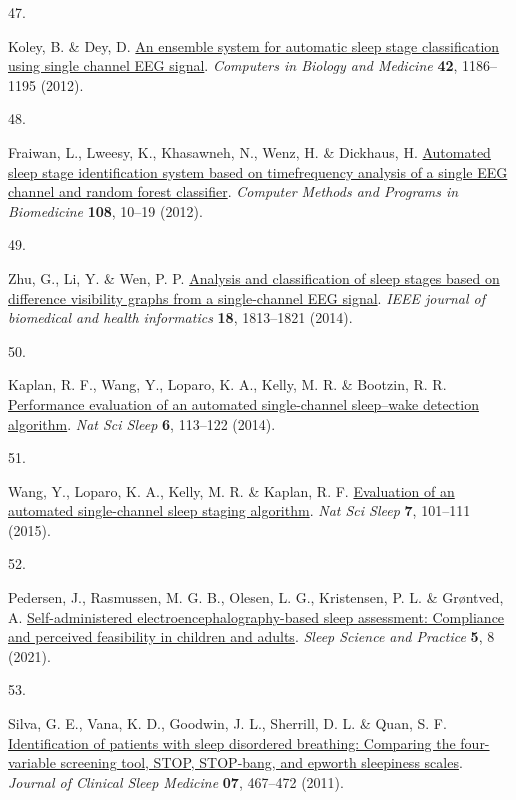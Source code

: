 \documentclass[
  10pt,
]{scrbook}
\newlength{\cslhangindent}
\newlength{\csllabelwidth}
\newlength{\cslentryspacingunit} %
\newenvironment{CSLReferences}[2] %
 {%
  \setlength{\parindent}{0pt}
  \ifodd #1
  \let\oldpar\par
  \def\par{\hangindent=\cslhangindent\oldpar}
  \fi
  \setlength{\parskip}{#2\cslentryspacingunit}
 }%
 {}
\newcommand{\CSLLeftMargin}[1]{\parbox[t]{\csllabelwidth}{#1}}
\newcommand{\CSLRightInline}[1]{\parbox[t]{\linewidth - \csllabelwidth}{#1}\break}
\let\originaltextbf\textbf
\renewcommand{\textbf}[1]{\textcolor{color1}{\textsf{\originaltextbf{#1}}}}
\begin{document}
\begin{CSLReferences}{0}{0}
\leavevmode{}%
\CSLLeftMargin{47. }%
\CSLRightInline{Koley, B. \& Dey, D.
\href{https://doi.org/10.1016/j.compbiomed.2012.09.012}{An ensemble
system for automatic sleep stage classification using single channel EEG
signal}. \emph{Computers in Biology and Medicine} \textbf{42},
1186--1195 (2012).}

\leavevmode{}%
\CSLLeftMargin{48. }%
\CSLRightInline{Fraiwan, L., Lweesy, K., Khasawneh, N., Wenz, H. \&
Dickhaus, H. \href{https://doi.org/10.1016/j.cmpb.2011.11.005}{Automated
sleep stage identification system based on time{\textendash}frequency
analysis of a single EEG channel and random forest classifier}.
\emph{Computer Methods and Programs in Biomedicine} \textbf{108}, 10--19
(2012).}

\leavevmode{}%
\CSLLeftMargin{49. }%
\CSLRightInline{Zhu, G., Li, Y. \& Wen, P. P.
\href{https://doi.org/10.1109/JBHI.2014.2303991}{Analysis and
classification of sleep stages based on difference visibility graphs
from a single-channel EEG signal}. \emph{IEEE journal of biomedical and
health informatics} \textbf{18}, 1813--1821 (2014).}

\leavevmode{}%
\CSLLeftMargin{50. }%
\CSLRightInline{Kaplan, R. F., Wang, Y., Loparo, K. A., Kelly, M. R. \&
Bootzin, R. R. \href{https://doi.org/10.2147/NSS.S71159}{Performance
evaluation of an automated single-channel sleep--wake detection
algorithm}. \emph{Nat Sci Sleep} \textbf{6}, 113--122 (2014).}

\leavevmode{}%
\CSLLeftMargin{51. }%
\CSLRightInline{Wang, Y., Loparo, K. A., Kelly, M. R. \& Kaplan, R. F.
\href{https://doi.org/10.2147/NSS.S77888}{Evaluation of an automated
single-channel sleep staging algorithm}. \emph{Nat Sci Sleep}
\textbf{7}, 101--111 (2015).}

\leavevmode{}%
\CSLLeftMargin{52. }%
\CSLRightInline{Pedersen, J., Rasmussen, M. G. B., Olesen, L. G.,
Kristensen, P. L. \& Grøntved, A.
\href{https://doi.org/10.1186/s41606-021-00059-1}{Self-administered
electroencephalography-based sleep assessment: Compliance and perceived
feasibility in children and adults}. \emph{Sleep Science and Practice}
\textbf{5}, 8 (2021).}

\leavevmode{}%
\CSLLeftMargin{53. }%
\CSLRightInline{Silva, G. E., Vana, K. D., Goodwin, J. L., Sherrill, D.
L. \& Quan, S. F.
\href{https://doi.org/10.5664/JCSM.1308}{Identification of patients with
sleep disordered breathing: Comparing the four-variable screening tool,
STOP, STOP-bang, and epworth sleepiness scales}. \emph{Journal of
Clinical Sleep Medicine} \textbf{07}, 467--472 (2011).}


\end{CSLReferences}
\end{document}
